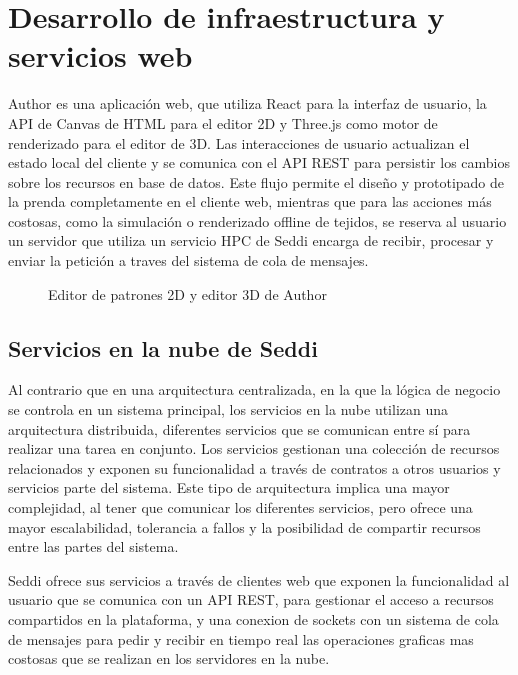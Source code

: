 \chapter{Desarrollo de infraestructura y servicios web}

Author es una aplicaci\'on web, que utiliza React para la interfaz de usuario, la API de
Canvas de HTML para el editor 2D y Three.js como motor de renderizado para el editor de 3D. Las interacciones de
usuario actualizan el estado local del cliente y se comunica con el API REST para persistir los cambios sobre
los recursos en base de datos. Este flujo permite el dise\~no y prototipado de la prenda completamente en el
cliente web, mientras que para las acciones m\'as costosas, como la simulaci\'on o renderizado offline de tejidos,
se reserva al usuario un servidor que utiliza un servicio HPC de Seddi encarga de recibir, procesar y enviar la
petici\'on a traves del sistema de cola de mensajes.

\begin{figure}[H]
  \vspace{1cm}
  \centering
  \caption{Editor de patrones 2D y editor 3D de Author}
  \vspace{0.5cm}
\end{figure}

\section{Servicios en la nube de Seddi}

\bgroup

  Al contrario que en una arquitectura centralizada, en la que la l\'ogica de negocio se controla en un sistema
  principal, los servicios en la nube utilizan una arquitectura distribuida, diferentes servicios que se comunican
  entre s\'i para realizar una tarea en conjunto. Los servicios gestionan una colecci\'on de recursos relacionados
  y exponen su funcionalidad a trav\'es de contratos a otros usuarios y servicios parte del sistema. Este tipo de
  arquitectura implica una mayor complejidad, al tener que comunicar los diferentes servicios, pero ofrece una
  mayor escalabilidad, tolerancia a fallos y la posibilidad de compartir recursos entre las partes del sistema.

  Seddi ofrece sus servicios a trav\'es de clientes web que exponen la funcionalidad al usuario que se comunica con un API
  REST, para gestionar el acceso a recursos compartidos en la plataforma, y una conexion de sockets con un sistema de cola de
  mensajes para pedir y recibir en tiempo real las operaciones graficas mas costosas que se realizan en los servidores en la nube.

